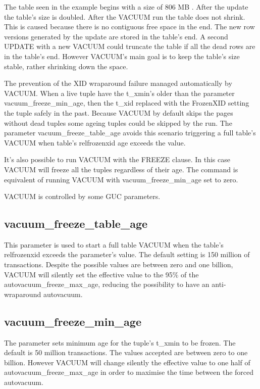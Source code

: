 The table seen in the example begins with a size of 806 MB . After the update the table's size is doubled. 
After the VACUUM run the table does not shrink. This is caused because there is no contiguous free space in 
the end. The new row versions generated by the update are stored in the table's end. A second UPDATE 
with a new VACUUM could truncate the table if all the dead rows are in the table's end. However 
VACUUM's main goal is to keep the table's size stable, rather shrinking down the space.\newline

The prevention of the XID wraparound failure managed automatically by VACUUM. When a live tuple have the 
t\_xmin's older than the parameter vacuum\_freeze\_min\_age, then the t\_xid replaced with the 
FrozenXID setting the tuple safely in the past. Because VACUUM by default skips the pages without dead 
tuples some ageing tuples could be skipped by the run. The parameter vacuum\_freeze\_table\_age avoids 
this scenario triggering a full table's VACUUM when table's relfrozenxid age exceeds the value.\newline

It's also possible to run VACUUM with the FREEZE  clause. In this case VACUUM 
will freeze all the tuples regardless of their age. The command is equivalent of running VACUUM with 
vacuum\_freeze\_min\_age set to zero.\newline

VACUUM is controlled by some GUC parameters.

\subsection{vacuum\_freeze\_table\_age}
This parameter is used to start a full table VACUUM when the table's relfrozenxid exceeds the parameter's 
value. The default setting is 150 million of transactions. Despite the possible values are between zero 
and one billion, VACUUM will silently set the effective value to the 95\% of 
the autovacuum\_freeze\_max\_age, reducing the possibility to have an anti-wraparound autovacuum.

\subsection{vacuum\_freeze\_min\_age}
The parameter sets minimum age for the tuple's t\_xmin to be frozen. The default is 50 million 
transactions. The values accepted are between zero to one billion. However VACUUM will change silently the 
effective value to one half of autovacuum\_freeze\_max\_age in order to maximise the time between the 
forced autovacuum.

